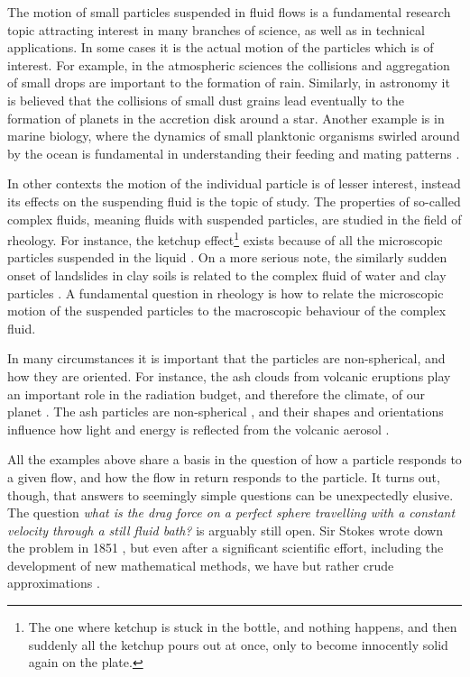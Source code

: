 \documentclass[thesis.tex]{subfiles}
\begin{document}
The motion of small particles suspended in fluid flows is a fundamental research topic attracting interest in many branches of science, as well as in technical applications. In some cases it is the actual motion of the particles which is of interest. For example, in the atmospheric sciences the collisions and aggregation of small drops are important to the formation of rain. Similarly, in astronomy it is believed that the collisions of small dust grains lead eventually to the formation of planets in the accretion disk around a star. Another example is in marine biology, where the dynamics of small planktonic organisms swirled around by the ocean is fundamental in understanding their feeding and mating patterns \cite{guasto2012}. 

In other contexts the motion of the individual particle is of lesser interest, instead its effects on the suspending fluid is the topic of study. The properties of so-called complex fluids, meaning fluids with suspended particles, are studied in the field of rheology. For instance, the ketchup effect\footnote{The one where ketchup is stuck in the bottle, and nothing happens, and then suddenly all the ketchup pours out at once, only to become innocently solid again on the plate.} exists because of all the microscopic particles suspended in the liquid \cite{bayod2008}. On a more serious note, the similarly sudden onset of landslides in clay soils is related to the complex fluid of water and clay particles \cite{coussot2002}. A fundamental question in rheology is how to relate the microscopic motion of the suspended particles to the macroscopic behaviour of the complex fluid.

In many circumstances it is important that the particles are non-spherical, and how they are oriented. For instance, the ash clouds from volcanic eruptions play an important role in the radiation budget, and therefore the climate, of our planet \cite{mather2003}. The ash particles are non-spherical \cite{gasteiger2011}, and their shapes and orientations influence how light and energy is reflected from the volcanic aerosol \cite{dubovik2002}. 

All the examples above share a basis in the question of how a particle responds to a given flow, and how the flow in return responds to the particle. It turns out, though, that answers to seemingly simple questions can be unexpectedly elusive. The question \emph{what is the drag force on a perfect sphere travelling with a constant velocity through a still fluid bath?} is arguably still open. Sir Stokes wrote down the problem in 1851 \cite{stokes1851}, but even after a significant scientific effort, including the development of new mathematical methods, we have but rather crude approximations \cite{goldenfeld2007}. 
\end{document}
